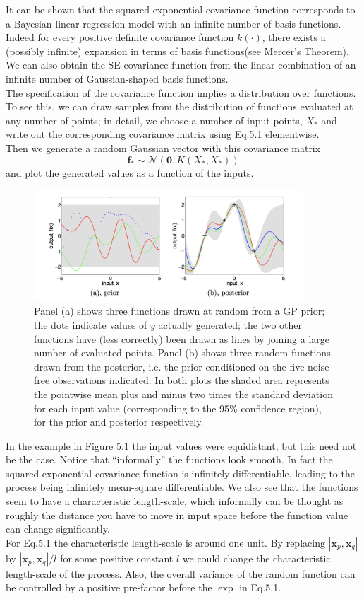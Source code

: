\documentclass[twoside]{article}
\begin{document}
It can be shown that the squared exponential covariance function corresponds to a Bayesian linear regression model with an infinite number of basis functions. Indeed for every positive definite covariance function $k(\cdot)$, there exists a (possibly infinite) expansion in terms of basis functions(see Mercer's Theorem). We can also obtain the SE covariance function from the linear combination of an infinite number of Gaussian-shaped basis functions.\\
The specification of the covariance function implies a distribution over functions. To see this, we can draw samples from the distribution of functions evaluated at any number of points; in detail, we choose a number of input points, $X_*$ and write out the corresponding covariance matrix using Eq.5.1 elementwise.\\
Then we generate a random Gaussian vector with this covariance matrix
\begin{equation*}
    \textbf{f}_* \sim \mathcal{N}(\boldsymbol{0}, K(X_*, X_*))
\end{equation*}
and plot the generated values as a function of the inputs.
\begin{figure}[ht]
\caption{Panel (a) shows three functions drawn at random from a GP prior; the dots indicate values of $y$ actually generated; the two other functions have (less correctly) been drawn as lines by joining a large number of evaluated points. Panel (b) shows three random functions drawn from the posterior, i.e. the prior conditioned on the five noise free observations indicated. In both plots the shaded area represents the pointwise mean plus and minus two times the standard deviation for each input value (corresponding to the 95\% confidence region), for the prior and posterior respectively.}
\centering
\includegraphics[width=0.90\textwidth]{img/gaussian_process.png}
\end{figure}
\newpage
In the example in Figure 5.1 the input values were equidistant, but this need not be the case. Notice that “informally” the functions look smooth. In fact the squared exponential covariance function is infinitely differentiable, leading to the process being infinitely mean-square differentiable. We also see that the functions seem to have a characteristic length-scale,
which informally can be thought as roughly the distance you have to move in input space before the function value can change significantly.\\
For Eq.5.1 the characteristic length-scale is around one unit. By replacing $|\boldsymbol{x}_p, \boldsymbol{x}_q|$ by $|\boldsymbol{x}_p, \boldsymbol{x}_q|/l$ for some positive constant $l$ we could change the characteristic length-scale of the process. Also, the overall variance of the random function can be controlled by a positive pre-factor before the $\exp$ in Eq.5.1.
\end{document}
